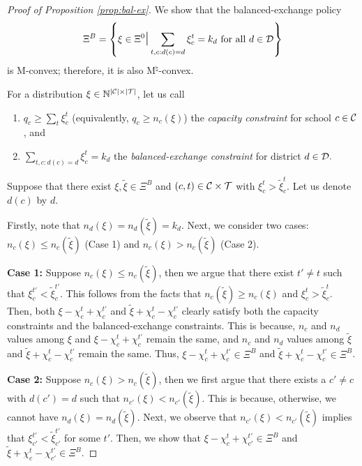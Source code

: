 \documentclass[12pt]{amsart}
\theoremstyle{remark}
\def\T{\mathcal{T}} \def\calt{\mathcal{T}}
\begin{document}
\medskip


\begin{proof}[Proof of Proposition \ref{prop:bal-ex}]

We show that the balanced-exchange policy \[\Xi^{B} = \left \{\xi \in \Xi^0 \mathlarger{\mathlarger{\mid}} \sum_{t,c:d(c)=d} \xi_c^t = k_{d} \text{ for all } d \in \cald \right \}\]
is M-convex; therefore, it is also M$^{\natural}$-convex.

For a distribution $\xi \in \mathbb N^{|\C|\times |\T|}$, let us call
\begin{enumerate}
\item $q_c \geq \sum_t \xi_c^t$ (equivalently, $q_c \geq n_c(\xi)$) the \emph{capacity constraint} for school $c\in \mathcal{C}$, and
\item $\sum_{t,c:d(c)=d} \xi_c^t = k_{d}$  the \emph{balanced-exchange constraint} for district $d \in \mathcal{D}.$
\end{enumerate}

Suppose that there exist $\xi,\tilde{\xi}\in \Xi^{B}$ and $(c,t) \in \calc \times \calt$ with $\xi_c^t>\tilde{\xi}_{c}^{t}$. Let us denote $d(c)$ by $d$.

Firstly, note that $n_d(\xi) = n_d(\tilde \xi) = k_{d}$. Next, we consider two cases: $n_c(\xi) \leq n_c(\tilde \xi)$ (Case 1) and $n_c(\xi) > n_c(\tilde \xi)$ (Case 2).

\textbf{Case 1:} Suppose $n_c(\xi) \leq n_c(\tilde \xi)$, then we argue that there exist $t' \neq t$ such that $\xi_c^{t'} < \tilde{\xi}_{c}^{t'}$. This follows from the facts that $n_c(\tilde \xi)  \geq n_c(\xi)$ and $\xi_c^t>\tilde{\xi}_{c}^{t}$. Then, both $\xi-\chi_c^t+\chi_{c}^{t'}$ and $\tilde{\xi}+\chi_c^t-\chi_{c}^{t'}$ clearly satisfy both the capacity constraints and the balanced-exchange constraints. This is because, $n_c$ and $n_d$ values among $\xi$ and $\xi-\chi_c^t+\chi_{c}^{t'}$ remain the same, and $n_c$ and $n_d$ values among $\tilde \xi$ and $\tilde{\xi}+\chi_c^t-\chi_{c}^{t'}$ remain the same. Thus, $\xi-\chi_c^t+\chi_{c}^{t'} \in \Xi^{B}$ and $\tilde{\xi}+\chi_c^t-\chi_{c}^{t'}\in \Xi^{B}$.

\textbf{Case 2:} Suppose $n_c(\xi) > n_c(\tilde \xi)$, then we first argue that there exists a $c' \neq c$ with $d(c')=d$ such that $n_{c'}(\xi) < n_{c'}(\tilde \xi)$.
This is because, otherwise, we cannot have $n_d(\xi) = n_d(\tilde \xi)$. Next, we observe that $n_{c'}(\xi) < n_{c'}(\tilde \xi)$ implies that $ \xi_{c'}^{t'} <  \tilde{\xi}_{c'}^{t'}$ for some $t'$. Then, we show that $\xi-\chi_c^t+\chi_{c'}^{t'} \in \Xi^{B}$ and $\tilde{\xi}+\chi_c^t-\chi_{c'}^{t'}\in \Xi^{B}$.


\end{proof}
\end{document}
